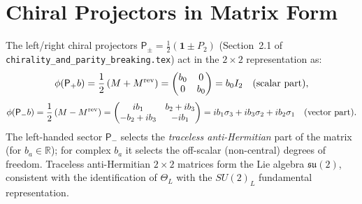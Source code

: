 \documentclass[12pt,a4paper]{article}
\theoremstyle{definition}
\theoremstyle{remark}
\begin{document}
\section{Chiral Projectors in Matrix Form}
\label{sec:mat:chiral}

The left/right chiral projectors
$\mathsf{P}_\pm = \frac{1}{2}(\mathbf{1}\pm P_2)$
(Section~2.1 of \texttt{chirality\_and\_parity\_breaking.tex})
act in the $2\times2$ representation as:
\begin{equation}
  \phi(\mathsf{P}_+b) = \frac{1}{2}\left(M + M^{\rm rev}\right)
  = \begin{pmatrix} b_0 & 0 \\ 0 & b_0 \end{pmatrix} = b_0 I_2
  \quad\text{(scalar part)},
  \label{eq:mat:P_plus}
\end{equation}
\begin{equation}
  \phi(\mathsf{P}_-b) = \frac{1}{2}\left(M - M^{\rm rev}\right)
  = \begin{pmatrix} ib_1 & b_2+ib_3 \\ -b_2+ib_3 & -ib_1 \end{pmatrix}
  = ib_1\sigma_3 + ib_3\sigma_2 + ib_2\sigma_1
  \quad\text{(vector part)}.
  \label{eq:mat:P_minus}
\end{equation}
The left-handed sector $\mathsf{P}_-$ selects the \emph{traceless anti-Hermitian}
part of the matrix (for $b_a\in\mathbb{R}$); for complex $b_a$ it selects
the off-scalar (non-central) degrees of freedom.
Traceless anti-Hermitian $2\times2$ matrices form the Lie algebra
$\mathfrak{su}(2)$, consistent with the identification of $\Theta_L$
with the $SU(2)_L$ fundamental representation.

\ifdefined\INCLUDEMODE
\else
  
\end{document}
